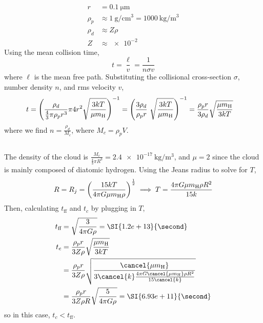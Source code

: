\documentclass{article}
\begin{document}
\subsection{}

\begin{align}
    r &= \SI{0.1}{\micro\meter} \\
    \rho_p &\approx \SI{1}{\gram\per\centi\meter\cubed} = \SI{1000}{\kilogram\per\meter\cubed} \\
    \rho_d &\approx Z \rho \\
    Z &\approx \num{e-2}
\end{align}
Using the mean collision time,
\begin{equation}
    t = \frac{\ell}{v} = \frac{1}{n \sigma v}
\end{equation}
where \(\ell\) is the mean free path.
Substituting the collisional cross-section \(\sigma\), number density \(n\), and rms velocity \(v\),
\begin{align}
    t &= \left(\frac{\rho_d}{\frac{4}{3} \pi \rho_p r^3} \pi 4r^2 \sqrt{\frac{3kT}{\mu m_{\ce{H}}}}\right)^{-1} = \left(\frac{3 \rho_d}{\rho_p r}\ \sqrt{\frac{3kT}{\mu m_{\ce{H}}}}\right)^{-1} = \frac{\rho_p r}{3 \rho_d} \sqrt{\frac{\mu m_{\ce{H}}}{3kT}}
\end{align}
where we find \(n = \frac{\rho_d}{M_c}\), where \(M_c = \rho_p V\).

\subsection{}

The density of the cloud is \(\frac{M_c}{\frac{4}{3} \pi R^3} = \SI{2.4e-17}{\kilogram\per\meter\cubed}\), and \(\mu = 2\) since the cloud is mainly composed of diatomic hydrogen.
Using the Jeans radius to solve for \(T\),
\begin{equation}
    R = R_j = \left(\frac{15kT}{4 \pi G \mu m_{\ce{H}} \rho}\right)^{\frac{1}{2}} \implies T = \frac{4 \pi G \mu m_{\ce{H}} \rho R^2}{15k}
\end{equation}
Then, calculating \(t_{\text{ff}}\) and \(t_c\) by plugging in \(T\),
\begin{align}
    t_{\text{ff}} &= \sqrt{\frac{3}{4 \pi G \rho}} = \SI{1.2e+13}{\second} \\
    t_c &= \frac{\rho_p r}{3 Z \rho} \sqrt{\frac{\mu m_{\ce{H}}}{3kT}} \\
    &= \frac{\rho_p r}{3 Z \rho} \sqrt{\frac{\cancel{\mu m_{\ce{H}}}}{3\cancel{k}\frac{4 \pi G \cancel{\mu m_{\ce{H}}} \rho R^2}{15\cancel{k}}}} \\
    &= \frac{\rho_p r}{3 Z \rho R} \sqrt{\frac{5}{4 \pi G \rho}} = \SI{6.93e+11}{\second}
\end{align}
so in this case, \(t_c < t_{\text{ff}}\).
\end{document}
